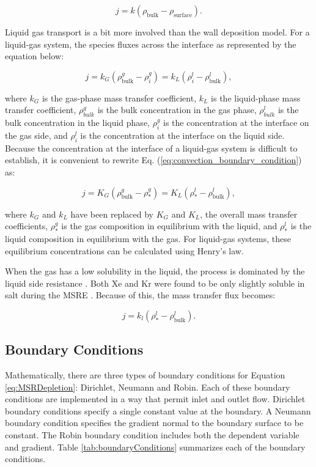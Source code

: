 \begin{equation}
    j = k(\rho_{\text{bulk}} - \rho_{\text{surface}}).
\end{equation}

Liquid gas transport is a bit more involved than the wall deposition model. For a liquid-gas system, the species fluxes across the interface as represented by the equation below:

 \begin{equation}
	j = k_{G}(\rho^{g}_{\text{bulk}} - \rho^{g}_{i}) = k_{L}(\rho^{l}_{i} - \rho^{l}_{\text{bulk}})
	\label{eq:convection_boundary_condition},
\end{equation}

\noindent where $k_{G}$ is the gas-phase mass transfer coefficient, $k_{L}$ is the liquid-phase mass transfer coefficient, $\rho^{g}_{bulk}$ is the bulk concentration in the gas phase, $\rho^{l}_{bulk}$ is the bulk concentration in the liquid phase, $\rho^{g}_{i}$ is the concentration at the interface on the gas side, and $\rho^{l}_{i}$ is the concentration at the interface on the liquid side. Because the concentration at the interface of a liquid-gas system is difficult to establish, it is convenient to rewrite Eq. (\ref{eq:convection_boundary_condition}) as:

 \begin{equation}
	j = K_{G}(\rho^{g}_{\text{bulk}} - \rho^{g}_{*}) = K_{L}(\rho^{l}_{*} - \rho^{l}_{\text{bulk}})
	\label{eq:overall_convection_boundary_condition},
\end{equation}

\noindent where $k_{G}$ and $k_{L}$ have been replaced by $K_{G}$ and $K_{L}$, the overall mass transfer coefficients, $\rho^{g}_{*}$ is the gas composition in equilibrium with the liquid, and $\rho^{l}_{*}$ is the liquid composition in equilibrium with the gas. For liquid-gas systems, these equilibrium concentrations can be calculated using Henry's law. 

When the gas has a low solubility in the liquid, the process is dominated by the liquid side resistance \cite{bird2006}. Both Xe and Kr were found to be only slightly soluble in salt during the MSRE \cite{kedl1972}. Because of this, the mass transfer flux becomes:

\begin{equation}
    j = k_{l}(\rho^{l}_{*} - \rho^{l}_{\text{bulk}}).
\end{equation}

\subsection{Boundary Conditions}
Mathematically, there are three types of boundary conditions for Equation \ref{eq:MSRDepletion}: Dirichlet, Neumann and Robin. Each of these boundary conditions are implemented in a way that permit inlet and outlet flow. Dirichlet boundary conditions specify a single constant value at the boundary. A Neumann boundary condition specifies the gradient normal to the boundary surface to be constant. The Robin boundary condition includes both the dependent variable and gradient. Table \ref{tab:boundaryConditions} summarizes each of the boundary conditions.

